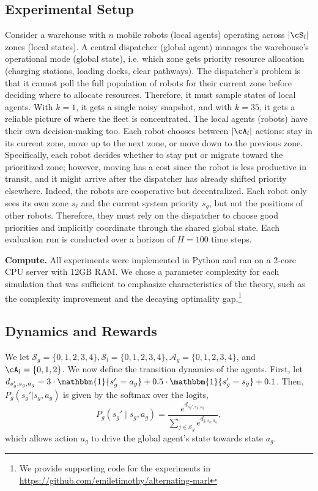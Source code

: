 \documentclass{article}
\theoremstyle{plain}
\theoremstyle{definition}
\begin{document}
\label{sec: numerical simulations}

\subsection{Experimental Setup}


 Consider a warehouse with $n$ mobile robots (local agents) operating across $|\cS_l|$ zones (local states). A central dispatcher (global agent) manages the warehouse's operational mode (global state), i.e. which zone gets priority resource allocation (charging stations, loading docks, clear pathways).  The dispatcher's problem is that it cannot poll the full population of robots for their current zone before deciding where to allocate resources. Therefore, it must sample states of local agents. With $k=1$, it gets a single noisy snapshot, and with $k=35$, it gets a reliable picture of where the fleet is concentrated. The local agents (robots) have their own decision-making too. Each robot chooses between $|\cA_l|$ actions: stay in its current zone, move up to the next zone, or move down to the previous zone. Specifically, each robot decides whether to stay put or migrate toward the prioritized zone; however, moving has a cost since the robot is less productive in transit, and it might arrive after the dispatcher has already shifted priority elsewhere. 
 Indeed, the robots are cooperative but decentralized. Each robot only sees its own zone $s_\ell$ and the current system priority $s_g$, but not the positions of other robots. Therefore, they must rely on the dispatcher to choose good priorities and implicitly coordinate through the shared global state.
 Each evaluation run is conducted over a horizon of $H=100$ time steps.


\textbf{Compute.} All experiments were implemented in Python and ran on a 2-core CPU server with 12GB RAM. We chose a parameter complexity for each simulation that was sufficient to emphasize
characteristics of the theory, such as the complexity improvement and the decaying optimality gap.\footnote{We provide supporting code for the experiments in \url{https://github.com/emiletimothy/alternating-marl}} 


\subsection{Dynamics and Rewards}

We let $\mathcal{S}_g=\{0,1,2,3,4\}, \mathcal{S}_l=\{0,1,2,3,4\}, \mathcal{A}_g=\{0,1,2,3,4\}$, and $\cA_l=\{0, 1, 2\}$. We now define the transition dynamics of the agents. First, let 
$d_{s_g',s_g,a_g} = 3\cdot \mathbbm{1}\{s_g'=a_g\} + 0.5 \cdot \mathbbm{1}\{s_g' = s_g\} + 0.1$.
Then, $P_g(s_g'|s_g, a_g)$ is given by the softmax over the logits, 
\[P_g(s_g' \mid s_g, a_g) = \frac{e^{d_{s_g',s_g,a_g}}}{\sum_{j\in\mathcal{S}_g} e^{d_{j,s_g,a_g}}},\]
which allows action $a_g$ to drive the global agent's state towards state $a_g$. 
\end{document}
